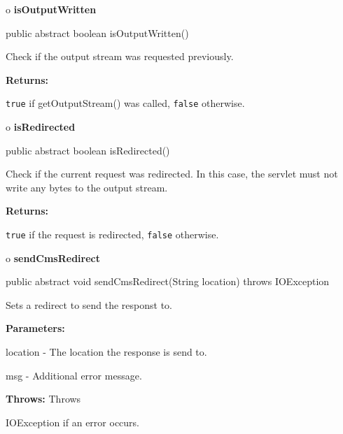 o {\bf isOutputWritten} 

\begin{PRE}
 public abstract boolean isOutputWritten()
\end{PRE}

\begin{description}
\htmlDD Check if the output stream was requested previously. 

\begin{description}
\item {\bf Returns:}  

{\tt true} if getOutputStream() was called, {\tt false} otherwise.  
\end{description}

\end{description}

o {\bf isRedirected} 

\begin{PRE}
 public abstract boolean isRedirected()
\end{PRE}

\begin{description}
\htmlDD Check if the current request was redirected. In this case, the servlet
must not write any bytes to the output stream. 

\begin{description}
\item {\bf Returns:}  

{\tt true} if the request is redirected, {\tt false} otherwise.  
\end{description}

\end{description}

o {\bf sendCmsRedirect} 

\begin{PRE}
 public abstract void sendCmsRedirect(String location) throws IOException
\end{PRE}

\begin{description}
\htmlDD Sets a redirect to send the responst to. 

\begin{description}
\item {\bf Parameters:}  

location - The location the response is send to.  

msg - Additional error message.  
\item {\bf Throws:} Throws  

IOException if an error occurs.  
\end{description}

\end{description}

